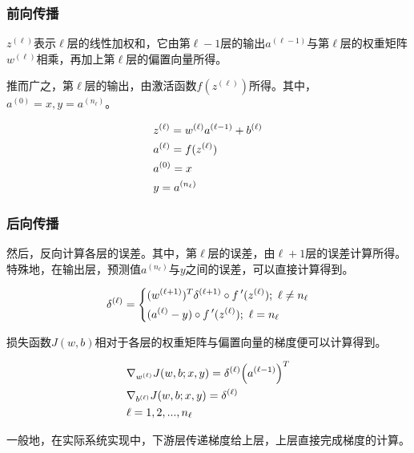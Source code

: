 \begin{content}
\subsubsection{前向传播}

$z^{(\ell )}$表示$\ell$层的线性加权和，它由第$\ell - 1$层的输出$a^{(\ell  - 1)}$与第$\ell$层的权重矩阵$w^{(\ell )}$相乘，再加上第$\ell$层的偏置向量所得。

推而广之，第$\ell$层的输出，由激活函数$f({z^{(\ell )}})$所得。其中，$a^{(0)} = x, y = {a^{({n_\ell })}}$。

\[\begin{gathered}
  {z^{(\ell )}} = {w^{(\ell )}}{a^{(\ell  - 1)}} + {b^{(\ell )}} \hfill \\
  {a^{(\ell )}} = f({z^{(\ell )}}) \hfill \\
  {a^{(0)}} = x \hfill \\
  y = {a^{({n_\ell })}} \hfill \\ 
\end{gathered} \]

\subsubsection{后向传播}

然后，反向计算各层的误差。其中，第$\ell$层的误差，由$\ell + 1$层的误差计算所得。特殊地，在输出层，预测值$a^{({n_\ell })}$与$y$之间的误差，可以直接计算得到。

\[{\delta ^{(\ell)}} = \left\{ \begin{gathered}
  {({w^{(\ell + 1)}})^T}{\delta ^{(\ell + 1)}} \circ f\,'({z^{(\ell)}});{\text{  }}\ell \ne {n_\ell} \hfill \\
  ({a^{(\ell)}} - y) \circ f\,'({z^{(\ell)}}); {\text{  }}\ell = {n_\ell} \hfill \\ 
\end{gathered}  \right.\]

损失函数$J(w,b)$相对于各层的权重矩阵与偏置向量的梯度便可以计算得到。

\[\begin{gathered}
  {\nabla _{{w^{(\ell )}}}}J(w,b;x,y) = {\delta ^{(\ell )}}{\left( {{a^{(\ell  - 1)}}} \right)^T} \hfill \\
  {\nabla _{{b^{(\ell )}}}}J(w,b;x,y) = {\delta ^{(\ell )}} \hfill \\
  \ell  = 1,2,...,{n_\ell } \hfill \\ 
\end{gathered} \]

一般地，在实际系统实现中，下游层传递梯度给上层，上层直接完成梯度的计算。


\end{content}
